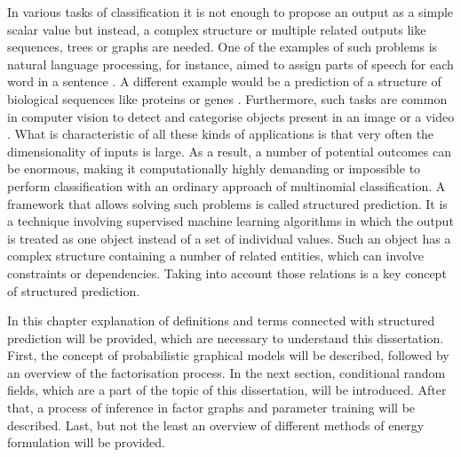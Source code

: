 In various tasks of classification it is not enough to propose an output as a simple scalar value but instead, a complex structure or multiple related outputs like sequences, trees or graphs are needed. One of the examples of such problems is natural language processing, for instance, aimed to assign parts of speech for each word in a sentence \cite{markov_altun}. A different example would be a prediction of a structure of biological sequences like proteins or genes \cite{graph_liu}. Furthermore, such tasks are common in computer vision to detect and categorise objects present in an image or a video \cite{crf_torralba}. What is characteristic of all these kinds of applications is that very often the dimensionality of inputs is large. As a result, a number of potential outcomes can be enormous, making it computationally highly demanding or impossible to perform classification with an ordinary approach of multinomial classification. A framework that allows solving such problems is called structured prediction. It is a technique involving supervised machine learning algorithms in which the output is treated as one object instead of a set of individual values. Such an object has a complex structure containing a number of related entities, which can involve constraints or dependencies. Taking into account those relations is a key concept of structured prediction. 

In this chapter explanation of definitions and terms connected with structured prediction will be provided, which are necessary to understand this dissertation. First, the concept of probabilistic graphical models will be described, followed by an overview of the factorisation process. In the next section, conditional random fields, which are a part of the topic of this dissertation, will be introduced. After that, a process of inference in factor graphs and parameter training will be described. Last, but not the least an overview of different methods of energy formulation will be provided. 